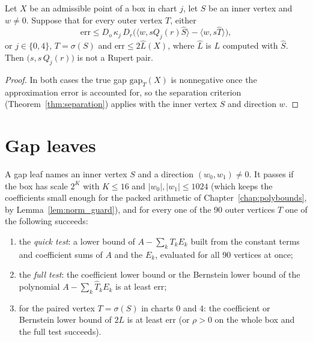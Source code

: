 \begin{theorem}
\label{thm:gap_core}
\leanok
{}
Let $X$ be an admissible point of a box in chart $j$, let $S$
be an inner vertex and $w \ne 0$. Suppose that for every outer vertex $T$, either
\[
  \mathrm{err} \le D_o\, \kappa_j\, D_r \bigl(\langle w, s Q_j(r) \hat S\rangle - \langle w, s \hat T\rangle\bigr),
\]
or $j \in \{0, 4\}$, $T = \sigma(S)$ and $\mathrm{err} \le 2 \hat L(X)$, where $\hat L$ is $L$
computed with $\hat S$. Then $\bigl(s, s\, Q_j(r)\bigr)$ is not a Rupert pair.
\end{theorem}
\begin{proof}
\leanok
In both cases the true gap $\mathrm{gap}_T(X)$ is nonnegative once the approximation
error is accounted for, so the separation criterion (Theorem~\ref{thm:separation})
applies with the inner vertex $S$ and direction $w$.
\end{proof}

\section{Gap leaves}

\begin{definition}
\label{def:gap_leaf}
\leanok
{}
A gap leaf names an inner vertex $S$ and a direction $(w_0, w_1) \ne 0$. It passes if
the box has scale $2^K$ with $K \le 16$ and $|w_0|, |w_1| \le 1024$ (which keeps the
coefficients small enough for the packed arithmetic of Chapter~\ref{chap:polybounds}, by
Lemma~\ref{lem:norm_guard}), and for every one of the 90 outer vertices $T$ one of the
following succeeds:
\begin{enumerate}
\item the \emph{quick test}: a lower bound of $A - \sum_k T_k E_k$ built from the constant
  terms and coefficient sums of $A$ and the $E_k$, evaluated for all 90 vertices at once;
\item the \emph{full test}: the coefficient lower bound or the Bernstein lower bound of
  the polynomial $A - \sum_k \hat T_k E_k$ is at least $\mathrm{err}$;
\item for the paired vertex $T = \sigma(S)$ in charts 0 and 4: the coefficient or
  Bernstein lower bound of $2L$ is at least $\mathrm{err}$ (or $\rho > 0$ on the whole box
  and the full test succeeds).
\end{enumerate}
\end{definition}

